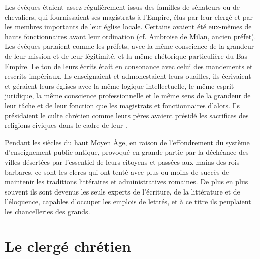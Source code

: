  Les évêques étaient assez régulièrement issus des familles de sénateurs ou de chevaliers, qui fournissaient ses magistrats à l'Empire, élus par leur clergé et par les membres importants de leur église locale. Certains avaient été eux-mêmes de hauts fonctionnaires avant leur ordination (cf. Ambroise de Milan, ancien préfet). Les évêques parlaient comme les préfets, avec la même conscience de la grandeur de leur mission et de leur légitimité, et la même rhétorique particulière du Bas Empire. Le ton de leurs écrits était en consonance avec celui des mandements et rescrits impériaux. Ils enseignaient et admonestaient leurs ouailles, ils écrivaient et géraient leurs églises avec la même logique intellectuelle, le même esprit juridique, la même conscience professionnelle et le même sens de la grandeur de leur tâche et de leur fonction que les magistrats et fonctionnaires d'alors. Ils présidaient le culte chrétien comme leurs pères avaient présidé les sacrifices des religions civiques dans le cadre de leur . 

 Pendant les siècles du haut Moyen Âge, en raison de l'effondrement du système d'enseignement public antique, provoqué en grande partie par la déchéance des villes désertées par l'essentiel de leurs citoyens et passées aux mains des rois barbares, ce sont les clercs qui ont tenté avec plus ou moins de succès de maintenir les traditions littéraires et administratives romaines. De plus en plus souvent ils sont devenus les seuls experts de l'écriture, de la littérature et de l'éloquence, capables d'occuper les emplois de lettrés, et à ce titre ils peuplaient les chancelleries des grands.
 






\section{Le clergé chrétien}


